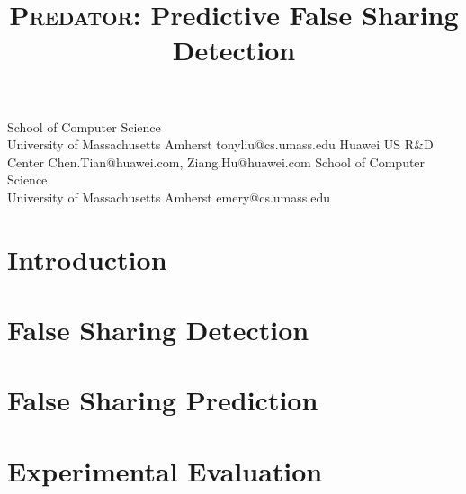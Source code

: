\documentclass[10pt]{sigplanconf}
\date{} %
\newcommand{\Predator}{{\scshape Predator}}
\begin{document}


\title{\Predator{}: Predictive False Sharing Detection}

           {School of Computer Science \\
           University of Massachusetts Amherst}
           {tonyliu@cs.umass.edu}
           {Huawei US R\&D Center}
           {Chen.Tian@huawei.com, Ziang.Hu@huawei.com}
           {School of Computer Science \\
             University of Massachusetts Amherst}
           {emery@cs.umass.edu}

\maketitle

\begin{abstract}

\end{abstract}

\begin{comment}
\category{CR-number}{subcategory}{third-level}

\terms
term1, term2

\keywords
keyword1, keyword2
\end{comment}

\section{Introduction}



\section{False Sharing Detection}


\section{False Sharing Prediction}


\section{Experimental Evaluation}

\end{document}
